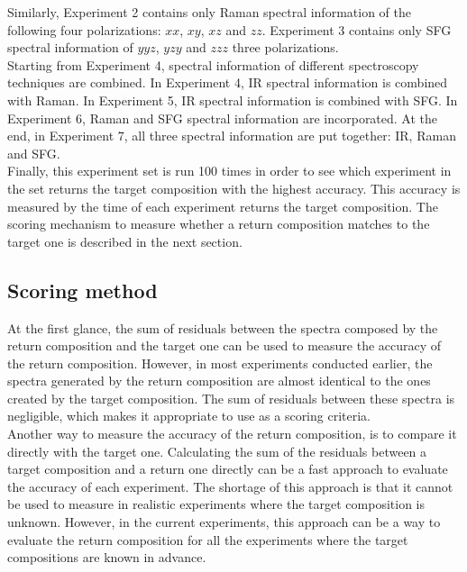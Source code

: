Similarly, Experiment 2 contains only Raman spectral information of the following four polarizations: $xx$, $xy$, $xz$ and $zz$. Experiment 3 contains only SFG spectral information of $yyz$, $yzy$ and $zzz$ three polarizations. \\

Starting from Experiment 4, spectral information of different spectroscopy techniques are combined. In Experiment 4, IR spectral information is combined with Raman. In Experiment 5, IR spectral information is combined with SFG. In Experiment 6, Raman and SFG spectral information are incorporated. At the end, in Experiment 7, all three spectral information are put together: IR, Raman and SFG. \\

Finally, this experiment set is run 100 times in order to see which experiment in the set returns the target composition with the highest accuracy. This accuracy is measured by the time of each experiment returns the target composition. The scoring mechanism to measure whether a return composition matches to the target one is described in the next section. \\

\subsection{Scoring method}

At the first glance, the sum of residuals between the spectra composed by the return composition and the target one can be used to measure the accuracy of the return composition. However, in most experiments conducted earlier, the spectra generated by the return composition are almost identical to the ones created by the target composition. The sum of residuals between these spectra is negligible, which makes it appropriate to use as a scoring criteria. \\

Another way to measure the accuracy of the return composition, is to compare it directly with the target one. Calculating the sum of the residuals between a target composition and a return one directly can be a fast approach to evaluate the accuracy of each experiment. The shortage of this approach is that it cannot be used to measure in realistic experiments where the target composition is unknown. However, in the current experiments, this approach can be a way to evaluate the return composition for all the experiments where the target compositions are known in advance. \\

